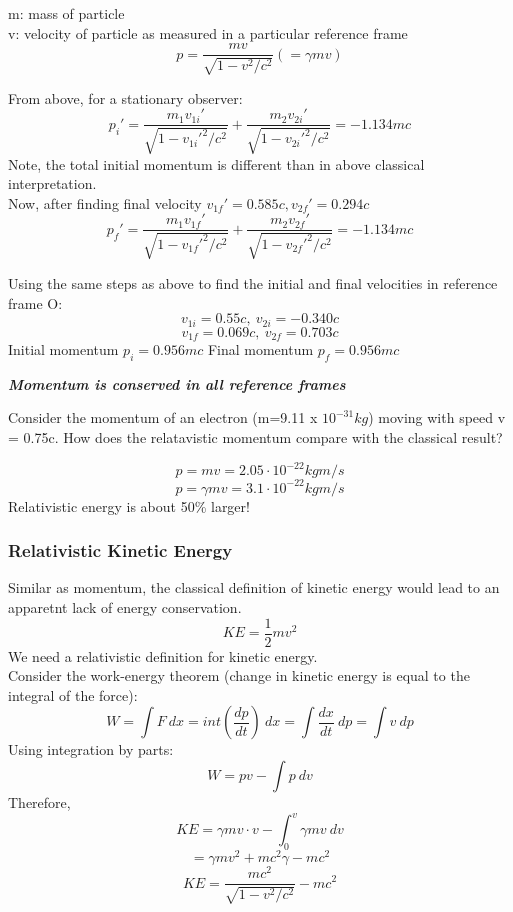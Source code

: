 \documentclass[class=article,crop=false]{standalone}
\begin{document}
\begin{result}
	m: mass of particle \\
	v: velocity of particle as measured in a particular reference frame\\
	$$ p = \frac{mv}{\sqrt{1 - v^2/c^2}} (= \gamma mv) $$

	From above, for a stationary observer:\\
	$$ p_i' = \frac{m_1 v_{1i}'}{\sqrt{1-v_{1i}'^2/c^2}} + \frac{m_2 v_{2i}'}{\sqrt{1-v_{2i}'^2/c^2}} = -1.134 mc $$
	Note, the total initial momentum is different than in above classical interpretation. \\
	Now, after finding final velocity $v_{1f}' = 0.585c, v_{2f}' = 0.294c$ \\
	$$ p_f' = \frac{m_1 v_{1f}'}{\sqrt{1-v_{1f}'^2/c^2}} + \frac{m_2 v_{2f}'}{\sqrt{1-v_{2f}'^2/c^2}} = -1.134 mc $$

	Using the same steps as above to find the initial and final velocities in reference frame O: \\
	$$v_{1i} = 0.55c,\ v_{2i} = -0.340c$$
	$$ v_{1f} = 0.069c,\ v_{2f} = 0.703c $$
	Initial momentum $p_i = 0.956 mc$
	Final momentum $p_f = 0.956 mc$

	\textbf{\emph{Momentum is conserved in all reference frames}}
\end{result}

\begin{question}
	Consider the momentum of an electron (m=9.11 x $10^{-31}kg$) moving with speed v = 0.75c. How does the relatavistic momentum compare with the classical result?
	\begin{answer}[Answer]
		$$ p = mv = 2.05 \cdot 10^{-22} kg m/s $$
		$$ p = \gamma mv = 3.1 \cdot 10^{-22}kg m/s $$
		Relativistic energy is about 50\% larger!
	\end{answer}
\end{question}

\subsubsection{Relativistic Kinetic Energy}
Similar as momentum, the classical definition of kinetic energy would lead to an apparetnt lack of energy conservation. 
$$ KE = \frac{1}{2}mv^2 $$
We need a relativistic definition for kinetic energy.\\

Consider the work-energy theorem (change in kinetic energy is equal to the integral of the force):
$$ W = \int F\ dx  = int (\frac{dp}{dt})\ dx = \int \frac{dx}{dt}\ dp = \int v\ dp $$
Using integration by parts:
$$ W = pv - \int p\ dv $$
Therefore,
$$ KE = \gamma mv \cdot v - \int_0^v \gamma mv\ dv $$
$$ = \gamma mv^2 + mc^2 \gamma - mc^2 $$
$$ KE = \frac{mc^2}{\sqrt{1-v^2/c^2}} - mc^2 $$
\end{document}
